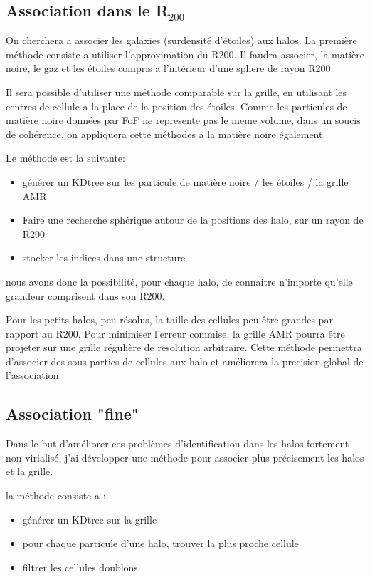 \subsection{Association dans le R$_{200}$}

On cherchera a associer les galaxies  (surdensité d'étoiles) aux halos.
La première méthode consiste a utiliser l'approximation du R200.
Il faudra associer, la matière noire, le gaz et les étoiles compris a l'intérieur d'une sphere de rayon R200.

Il sera possible d'utiliser une méthode comparable sur la grille, en utilisant les centres de cellule a la place de la position des étoiles.
Comme les particules de matière noire  données par FoF ne represente pas le meme volume, dans un soucis de cohérence, on appliquera cette méthodes a la matière noire également.

Le méthode est la suivante:

\begin{itemize}
\item générer un KDtree sur les particule de matière noire / les étoiles / la grille AMR
\item Faire une recherche sphérique autour de la positions des halo, sur un rayon de R200
\item stocker les indices dans une structure
\end{itemize}

nous avons donc la possibilité, pour chaque halo, de connaitre n'importe qu'elle grandeur comprisent dans son R200.


Pour les petits halos, peu résolus, la taille des cellules peu être grandes par rapport au R200.
Pour minimiser l'erreur commise, la grille AMR pourra être projeter sur une grille régulière de resolution arbitraire.
Cette méthode permettra d'associer des sous parties de cellules aux halo et améliorera la precision global de l'association.

\subsection{Association "fine"}
Dans le but d'améliorer ces problèmes d'identification dans les halos fortement non virialisé, j'ai développer une méthode pour associer plus précisement les halos et la grille.


la méthode consiste a :
\begin{itemize}
\item générer un KDtree sur la grille
\item pour chaque particule d'une halo, trouver la plus proche cellule
\item filtrer les cellules doublons
\end{itemize}

